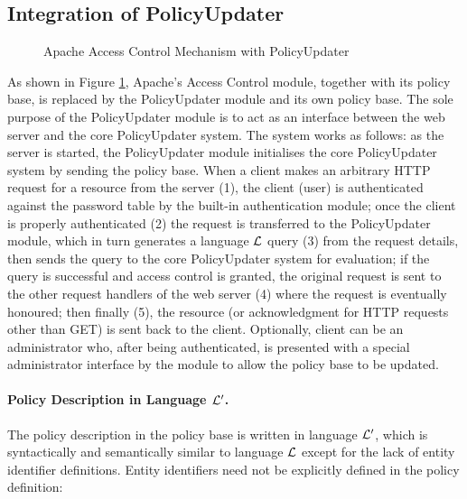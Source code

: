\documentclass[11pt]{llncs}
\begin{document}
    \subsection{Integration of PolicyUpdater}

      \begin{figure}[ht]
        \begin{center}
          \caption{Apache Access Control Mechanism with PolicyUpdater}
          \label{fig-3}
        \end{center}
      \end{figure}

      As shown in Figure \ref{fig-3}, Apache's Access Control module, together
      with its policy base, is replaced by the PolicyUpdater module and its own
      policy base. The sole purpose of the PolicyUpdater module is to act as an
      interface between the web server and the core PolicyUpdater system. The
      system works as follows: as the server is started, the PolicyUpdater
      module initialises the core PolicyUpdater system by sending the policy
      base. When a client makes an arbitrary HTTP request for a resource from
      the server (1), the client (user) is authenticated against the password
      table by the built-in authentication module; once the client is properly
      authenticated (2) the request is transferred to the PolicyUpdater module,
      which in turn generates a language ${\cal L}$ query (3) from the request
      details, then sends the query to the core PolicyUpdater system for
      evaluation; if the query is successful and access control is granted,
      the original request is sent to the other request handlers of the web
      server (4) where the request is eventually honoured; then finally (5),
      the resource (or acknowledgment for HTTP requests other than GET) is sent
      back to the client. Optionally, client can be an administrator who,
      after being authenticated, is presented with a special administrator
      interface by the module to allow the policy base to be updated.

      \paragraph{\bf Policy Description in Language ${\cal L'}$.}

        The policy description in the policy base is written in language
        ${\cal L'}$, which is syntactically and semantically similar to
        language ${\cal L}$ except for the lack of entity identifier
        definitions. Entity identifiers need not be explicitly defined in
        the policy definition:
\end{document}

